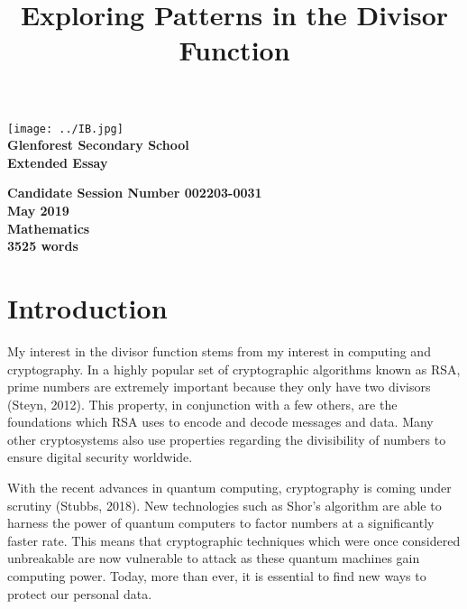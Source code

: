\documentclass[12pt]{article}
\title{\vspace{1.5cm}Exploring Patterns in the Divisor Function}
\date{}
\begin{document}
{\hspace{-0.5cm}\texttt{[image: ../IB.jpg]}}
\textbf{\\Glenforest Secondary School\\
Extended Essay}
	{\let\newpage\relax\maketitle}
\vspace{3cm}
\begin{flushright}
\textbf{Candidate Session Number 002203-0031\\
May 2019\\
Mathematics\\
3525 words}
\end{flushright}
\newpage
	\tableofcontents
\newpage
\doublespacing
	\section{Introduction}
		My interest in the divisor function stems from my interest in computing and cryptography. In a highly popular set of cryptographic algorithms known as RSA, prime numbers are extremely important because they only have two divisors (Steyn, 2012). This property, in conjunction with a few others, are the foundations which RSA uses to encode and decode messages and data. Many other cryptosystems also use properties regarding the divisibility of numbers to ensure digital security worldwide.

		With the recent advances in quantum computing, cryptography is coming under scrutiny (Stubbs, 2018). New technologies such as Shor's algorithm are able to harness the power of quantum computers to factor numbers at a significantly faster rate. This means that cryptographic techniques which were once considered unbreakable are now vulnerable to attack as these quantum machines gain computing power. Today, more than ever, it is essential to find new ways to protect our personal data.
		
\end{document}
